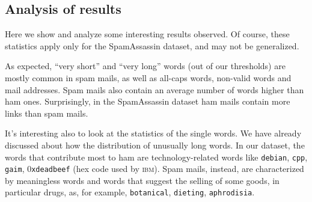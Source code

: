 \subsection{Analysis of results}
Here we show and analyze some interesting results observed. Of course, these statistics apply only for the SpamAssassin dataset, and may not be generalized.

As expected, ``very short'' and ``very long'' words (out of our thresholds) are mostly common in spam mails, as well as all-caps words, non-valid words and mail addresses. Spam mails also contain an average number of words higher than ham ones. Surprisingly, in the SpamAssassin dataset ham mails contain more links than spam mails.

It's interesting also to look at the statistics of the single words. We have already discussed about how the distribution of unusually long words. In our dataset, the words that contribute most to ham are technology-related words like \texttt{debian}, \texttt{cpp}, \texttt{gaim}, 0\texttt{xdeadbeef} (hex code used by \textsc{ibm}). Spam mails, instead, are characterized by meaningless words and words that suggest the selling of some goods, in particular drugs, as, for example, \texttt{botanical}, \texttt{dieting}, \texttt{aphrodisia}.

